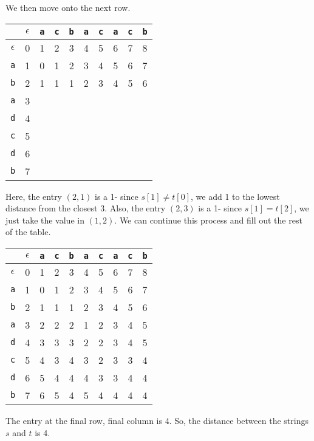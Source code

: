 \documentclass[a4paper, openany]{memoir}
\begin{document}
\noindent We then move onto the next row.
\begin{table}[H]
    \centering
    \begin{tabular}{|c|c|c|c|c|c|c|c|c|c|}
        \hline
         & $\epsilon$ & \texttt{a} & \texttt{c} & \texttt{b} & \texttt{a} & \texttt{c} & \texttt{a} & \texttt{c} & \texttt{b} \\
        \hline
        $\epsilon$ & 0 & 1 & 2 & 3 & 4 & 5 & 6 & 7 & 8 \\
        \hline
        \texttt{a} & 1 & 0 & 1 & 2 & 3 & 4 & 5 & 6 & 7 \\
        \hline
        \texttt{b} & 2 & {\color{red} 1} & 1 & {\color{brown} 1} & 2 & 3 & 4 & 5 & 6 \\
        \hline
        \texttt{a} & 3 & & & & & & & & \\
        \hline
        \texttt{d} & 4 & & & & & & & & \\
        \hline
        \texttt{c} & 5 & & & & & & & & \\
        \hline
        \texttt{d} & 6 & & & & & & & & \\
        \hline
        \texttt{b} & 7 & & & & & & & & \\
        \hline
    \end{tabular}
\end{table}
\noindent Here, the entry $(2, 1)$ is a 1- since $s[1] \neq t[0]$, we add 1 to the lowest distance from the closest 3. Also, the entry $(2, 3)$ is a 1- since $s[1] = t[2]$, we just take the value in $(1, 2)$. We can continue this process and fill out the rest of the table.
\begin{table}[H]
    \centering
    \begin{tabular}{|c|c|c|c|c|c|c|c|c|c|}
        \hline
         & $\epsilon$ & \texttt{a} & \texttt{c} & \texttt{b} & \texttt{a} & \texttt{c} & \texttt{a} & \texttt{c} & \texttt{b} \\
        \hline
        $\epsilon$ & 0 & 1 & 2 & 3 & 4 & 5 & 6 & 7 & 8 \\
        \hline
        \texttt{a} & 1 & 0 & 1 & 2 & 3 & 4 & 5 & 6 & 7 \\
        \hline
        \texttt{b} & 2 & 1 & 1 & 1 & 2 & 3 & 4 & 5 & 6 \\
        \hline
        \texttt{a} & 3 & 2 & 2 & 2 & 1 & 2 & 3 & 4 & 5 \\
        \hline
        \texttt{d} & 4 & 3 & 3 & 3 & 2 & 2 & 3 & 4 & 5 \\
        \hline
        \texttt{c} & 5 & 4 & 3 & 4 & 3 & 2 & 3 & 3 & 4 \\
        \hline
        \texttt{d} & 6 & 5 & 4 & 4 & 4 & 3 & 3 & 4 & 4 \\
        \hline
        \texttt{b} & 7 & 6 & 5 & 4 & 5 & 4 & 4 & 4 & {\color{brown} 4} \\
        \hline
    \end{tabular}
\end{table}
\noindent The entry at the final row, final column is 4. So, the distance between the strings $s$ and $t$ is 4.
\end{document}

